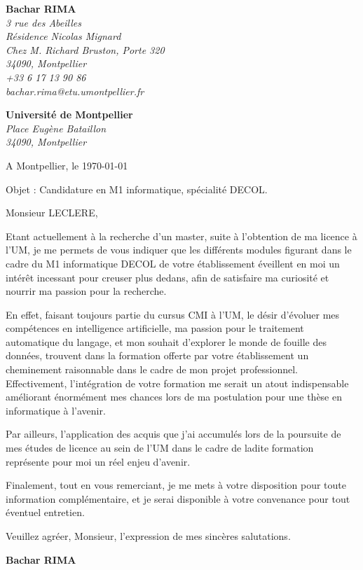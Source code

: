 \documentclass[11pt]{letter}
\begin{document}
  \hfill
  \begin{flushleft}{\bfseries Bachar RIMA}\\
    [.35ex]
    \small\itshape
      3 rue des Abeilles \\
      Résidence Nicolas Mignard \\
      Chez M. Richard Bruston, Porte 320 \\
      34090, Montpellier\\
      +33 6 17 13 90 86\\
      bachar.rima@etu.umontpellier.fr
  \end{flushleft}

  \begin{flushright}{\bfseries Université de Montpellier}\\
    [.35ex]
    \small\itshape
    Place Eugène Bataillon\\
    34090, Montpellier
  \end{flushright}

  \hfill
  \begin{flushright}
    A Montpellier, le \today
  \end{flushright}

  Objet : Candidature en M1 informatique, spécialité DECOL.

  Monsieur LECLERE,

  Etant actuellement à la recherche d’un master, suite à l'obtention de ma licence à l'UM, je me permets de vous indiquer que les différents modules figurant dans le cadre du M1 informatique DECOL de votre établissement éveillent en moi un intérêt incessant pour creuser plus dedans, afin de satisfaire ma curiosité et nourrir ma passion pour la recherche.

  En effet, faisant toujours partie du cursus CMI à l’UM, le désir d'évoluer mes compétences en intelligence artificielle, ma passion pour le traitement automatique du langage, et mon souhait d'explorer le monde de fouille des données, trouvent dans la formation offerte par votre établissement un cheminement raisonnable dans le cadre de mon projet professionnel. Effectivement, l'intégration de votre formation me serait un atout indispensable améliorant énormément mes chances lors de ma postulation pour une thèse en informatique à l'avenir.

  Par ailleurs, l'application des acquis que j'ai accumulés lors de la poursuite de mes études de licence au sein de l'UM dans le cadre de ladite formation représente pour moi un réel enjeu d’avenir.

  Finalement, tout en vous remerciant, je me mets à votre disposition pour toute information complémentaire, et je serai disponible à votre convenance pour tout éventuel entretien.

  Veuillez agréer, Monsieur, l’expression de mes sincères salutations.\\
  \begin{flushright}{\bfseries Bachar RIMA} \\
  \end{flushright}

  \vfill

 
\end{document}
